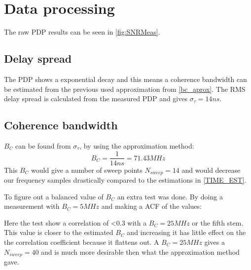 \section{Data processing}
The raw PDP results can be seen in  \autoref{fig:SNRMeas}.
\subsection{Delay spread}
The PDP shows a exponential decay and this means a coherence bandwidth can be estimated from the previous used approximation from \autoref{bc_aprox}. The RMS delay spread is calculated from the measured PDP and gives $\sigma_{\tau} = 14ns$.

\subsection{Coherence bandwidth}\label{sec:coherence_bandwidth}

$B_C$ can be found from $\sigma_{\tau}$, by using the approximation method:
\begin{equation}
B_C = \frac{1}{14ns} = 71.43 MHz 
\end{equation}
This $B_C$ would give a number of sweep points $N_{sweep} = 14$ and would decrease our  frequency samples drastically compared to the estimations in \autoref{TIME_EST}.

To figure out a balanced value of $B_C$ an extra test was done. By doing a measurement with $B_C = 5MHz$ and making a \gls{ACF} of the values:


Here the test show a correlation of <0.3 with a $B_C = 25MHz$ or the fifth stem. This value is closer to the estimated $B_C$ and increasing it has little effect on the  the correlation coefficient because it flattens out. A $B_C = 25MHz$ gives a $N_{sweep} = 40$ and is much more desirable then what the approximation method gave.

